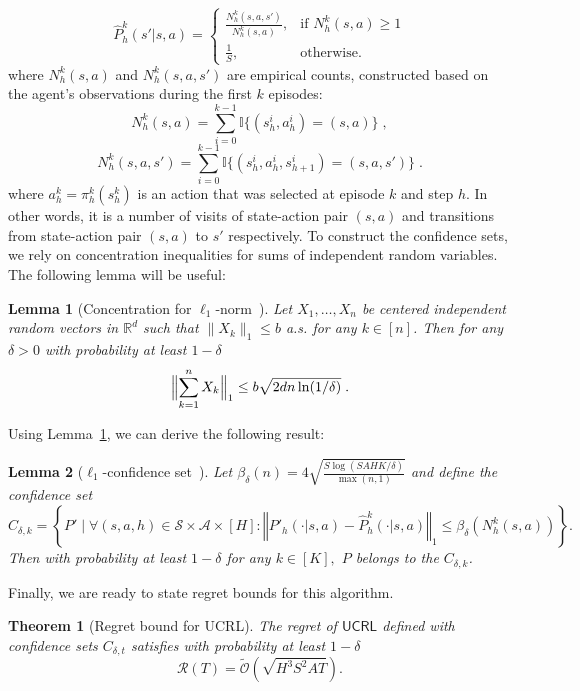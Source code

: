 \documentclass{article}
\numberwithin{equation}{section}
\newtheorem{theorem}{Theorem}
\newtheorem{lemma}{Lemma}
\newcommand{\norm}[1]{\|#1\|}
\newcommand{\R}{\mathbb{R}}
\newcommand{\cA}{\mathcal{A}}
\newcommand{\cS}{\mathcal{S}}
\newcommand{\one}[1]{\mathbb{I}\{#1\}}
\newcommand{\eqsp}{\;}
\begin{document}
\[
    \widehat{P}^k_h(s'|s,a) = \begin{cases}
        \frac{{N^k_h(s,a, s')}}{N_h^k(s,a)}, & \text{if } N_h^k(s,a) \geq 1 \\
        \frac{1}{S}, & \text{otherwise.}
    \end{cases}
\]
 where \( N_h^k(s, a) \) and \( N_h^k(s,a,s') \) are empirical counts, constructed based on the agent's observations during the first \( k \) episodes:
\[N_h^k(s,a)=\sum_{i=0}^{k-1}\one{(s_h^i,a_h^i)= (s,a)}\eqsp,\]
\[N_h^k(s,a,s')=\sum_{i=0}^{k-1}\one{(s_h^i,a_h^i,s_{h+1}^i)= (s,a,s')}\eqsp.\]
where $a^{k}_h = \pi^{k}_h(s^k_h)$ is an action that was selected at episode $k$ and step $h$. In other words, it is a number of visits of state-action pair $(s,a)$ and transitions from state-action pair $(s,a)$ to $s'$ respectively. To construct the confidence sets, we rely on concentration inequalities for sums of independent random variables. The following lemma will be useful:
\begin{lemma}[Concentration for $\ell_1$-norm~\cite{neu2020unifying}]\label{lem:ell1_norm_concentration}
    Let $X_1,\ldots,X_n$ be  centered independent random vectors in $\R^d$ such that $\norm{X_k}_1 \leq b$ a.s. for any $k \in [n]$. Then for any $\delta > 0$ with probability at least $1-\delta$
    \[
        \Bigl\Vert \sum_{k=1}^n X_k \Bigr\Vert_1 \leq b \sqrt{2dn\ln(1/\delta)}\eqsp.
    \]
\end{lemma}
Using Lemma~\ref{lem:ell1_norm_concentration}, we can derive the following result:
\begin{lemma}[$\ell_1$-confidence set~\cite{neu2020unifying}]\label{lm:lec04:ell1_confidence_set}
    Let $\beta_{\delta}(n) = 4\sqrt{\frac{S \log(SAHK/\delta)}{\max(n, 1)}}$ and define the confidence set
    \begin{equation}\label{eq:conf_set}
        C_{\delta, k} = \left\{ P' \mid \forall (s,a,h) \in \cS \times \cA\times [H]  : \left\Vert P'_h(\cdot|s,a) - \widehat{P}^k_h(\cdot|s,a) \right\Vert_1 \leq \beta_\delta(N^k_h(s,a))  \right\}.
    \end{equation}
    Then with probability at least $1-\delta$ for any $k \in [K],$ $P$ belongs to the $C_{\delta,k}$.
\end{lemma}
Finally, we are ready to state regret bounds for this algorithm. 
\begin{theorem}[Regret bound for UCRL]
\label{th:ucrl}
    The regret of $\mathsf{UCRL}$ defined with confidence sets $C_{\delta,t}$ satisfies with probability at least $1-\delta$
    \[
        \mathcal{R}(T) = \widetilde{\mathcal{O}}(\sqrt{H^3 S^2 AT}).
    \]
\end{theorem}
\end{document}
